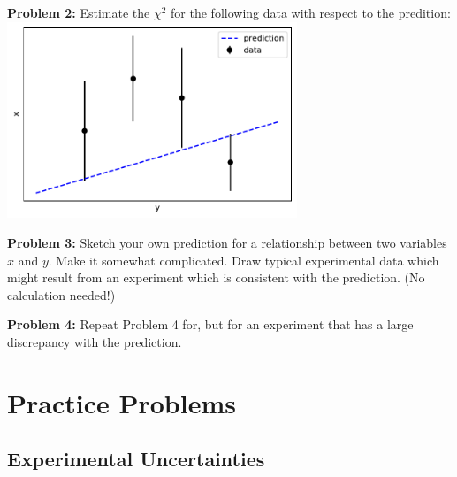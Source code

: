 \documentclass[12pt,oneside]{book}
\begin{document}
\vskip 1cm
\noindent
{\bf Problem 2:} Estimate the $\chi^2$ for the following data with respect to the predition:\\
{\includegraphics[width=0.65\textwidth]{figs/chisq.pdf}}

\vskip 1cm
\noindent
{\bf Problem 3:} Sketch your own prediction for a relationship between
two variables $x$ and $y$.  Make it somewhat complicated.  Draw
typical experimental data which might result from an
experiment which is consistent with the prediction.  (No calculation
needed!)

\vskip 1cm
\noindent
{\bf Problem 4:} Repeat Problem 4 for, but for an experiment that has
a large discrepancy with the prediction.


\appendix

\chapter{Practice Problems}
\section{Experimental Uncertainties}
\end{document}
